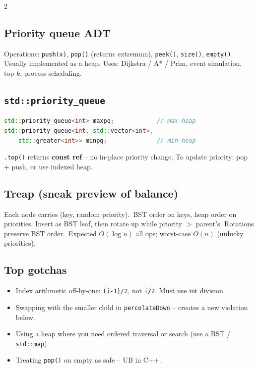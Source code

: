 \documentclass[10pt]{article}
\begin{document}
\begin{multicols}{2}
\subsection*{Priority queue ADT}
Operations: \texttt{push(x)}, \texttt{pop()} (returns extremum),
\texttt{peek()}, \texttt{size()}, \texttt{empty()}. Usually
implemented as a heap. Uses: Dijkstra / A* / Prim, event
simulation, top-$k$, process scheduling.

\subsection*{\texttt{std::priority\_queue}}
\begin{lstlisting}[language=C++]
std::priority_queue<int> maxpq;            // max-heap
std::priority_queue<int, std::vector<int>,
    std::greater<int>> minpq;              // min-heap
\end{lstlisting}
\texttt{.top()} returns \textbf{const ref} -- no in-place priority
change. To update priority: pop + push, or use indexed heap.

\subsection*{Treap (sneak preview of balance)}
Each node carries (key, random priority).\ BST order on keys,
heap order on priorities. Insert as BST leaf, then rotate up while
priority $>$ parent's. Rotations preserve BST order.\
Expected $O(\log n)$ all ops; worst-case $O(n)$ (unlucky priorities).

\subsection*{Top gotchas}
\begin{itemize}
    \item Index arithmetic off-by-one: \texttt{(i-1)/2}, not
        \texttt{i/2}. Must use int division.
    \item Swapping with the smaller child in
        \texttt{percolateDown} -- creates a new violation below.
    \item Using a heap where you need ordered traversal or
        search (use a BST / \texttt{std::map}).
    \item Treating \texttt{pop()} on empty as safe -- UB in C++.
\end{itemize}

\end{multicols}
\end{document}
